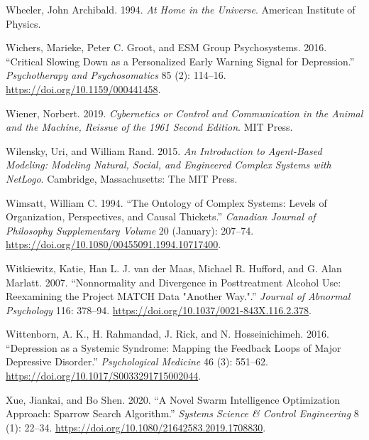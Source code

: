 \documentclass[
  a4paper,
  DIV=11,
  numbers=noendperiod]{scrreprt}
\newlength{\cslhangindent}
\newlength{\cslentryspacingunit} %
\newenvironment{CSLReferences}[2] %
 {%
  \setlength{\parindent}{0pt}
  \ifodd #1
  \let\oldpar\par
  \def\par{\hangindent=\cslhangindent\oldpar}
  \fi
  \setlength{\parskip}{#2\cslentryspacingunit}
 }%
 {}
\begin{document}
\begin{CSLReferences}{1}{0}
\leavevmode{}%
Wheeler, John Archibald. 1994. \emph{At {Home} in the {Universe}}.
{American Institute of Physics}.

\leavevmode{}%
Wichers, Marieke, Peter C. Groot, and ESM Group Psychosystems. 2016.
{``Critical {Slowing Down} as a {Personalized Early Warning Signal} for
{Depression}.''} \emph{Psychotherapy and Psychosomatics} 85 (2):
114--16. \url{https://doi.org/10.1159/000441458}.

\leavevmode{}%
Wiener, Norbert. 2019. \emph{Cybernetics or {Control} and
{Communication} in the {Animal} and the {Machine}, {Reissue} of the 1961
Second Edition}. {MIT Press}.

\leavevmode{}%
Wilensky, Uri, and William Rand. 2015. \emph{An Introduction to
Agent-Based Modeling: Modeling Natural, Social, and Engineered Complex
Systems with {NetLogo}}. {Cambridge, Massachusetts}: {The MIT Press}.

\leavevmode{}%
Wimsatt, William C. 1994. {``The Ontology of Complex Systems: Levels of
Organization, Perspectives, and Causal Thickets.''} \emph{Canadian
Journal of Philosophy Supplementary Volume} 20 (January): 207--74.
\url{https://doi.org/10.1080/00455091.1994.10717400}.

\leavevmode{}%
Witkiewitz, Katie, Han L. J. van der Maas, Michael R. Hufford, and G.
Alan Marlatt. 2007. {``Nonnormality and Divergence in Posttreatment
Alcohol Use: {Reexamining} the {Project MATCH} Data "Another Way.".''}
\emph{Journal of Abnormal Psychology} 116: 378--94.
\url{https://doi.org/10.1037/0021-843X.116.2.378}.

\leavevmode{}%
Wittenborn, A. K., H. Rahmandad, J. Rick, and N. Hosseinichimeh. 2016.
{``Depression as a Systemic Syndrome: Mapping the Feedback Loops of
Major Depressive Disorder.''} \emph{Psychological Medicine} 46 (3):
551--62. \url{https://doi.org/10.1017/S0033291715002044}.

\leavevmode{}%
Xue, Jiankai, and Bo Shen. 2020. {``A Novel Swarm Intelligence
Optimization Approach: Sparrow Search Algorithm.''} \emph{Systems
Science \& Control Engineering} 8 (1): 22--34.
\url{https://doi.org/10.1080/21642583.2019.1708830}.


\end{CSLReferences}
\end{document}
